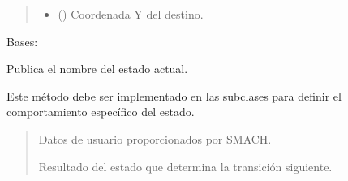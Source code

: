 \documentclass[a4paper,10pt,spanish]{sphinxmanual}
\begin{document}
\begin{fulllineitems}
\begin{fulllineitems}
\begin{quote}
\begin{description}
\begin{itemize}
\item {} 
\sphinxAtStartPar
{} () \textendash{} Coordenada Y del destino.

\end{itemize}

\end{description}\end{quote}

\end{fulllineitems}


\end{fulllineitems}


\begin{fulllineitems}
\label{\detokenize{squad_state_manager:squad_state_manager.EstadoReposo}}
\pysigstartsignatures
{}
\pysigstopsignatures
\sphinxAtStartPar
Bases: {\hyperref[\detokenize{squad_state_manager:squad_state_manager.BaseState}]{}}

\begin{fulllineitems}
\label{\detokenize{squad_state_manager:squad_state_manager.EstadoReposo.execute}}
\pysigstartsignatures
{}
\pysigstopsignatures
\sphinxAtStartPar
Publica el nombre del estado actual.

\sphinxAtStartPar
Este método debe ser implementado en las subclases para definir el comportamiento específico del estado.
\begin{quote}\begin{description}
\sphinxAtStartPar
{} \textendash{} Datos de usuario proporcionados por SMACH.

\sphinxAtStartPar
Resultado del estado que determina la transición siguiente.

\sphinxAtStartPar
{}

\end{description}\end{quote}

\end{fulllineitems}


\end{fulllineitems}
\end{document}
